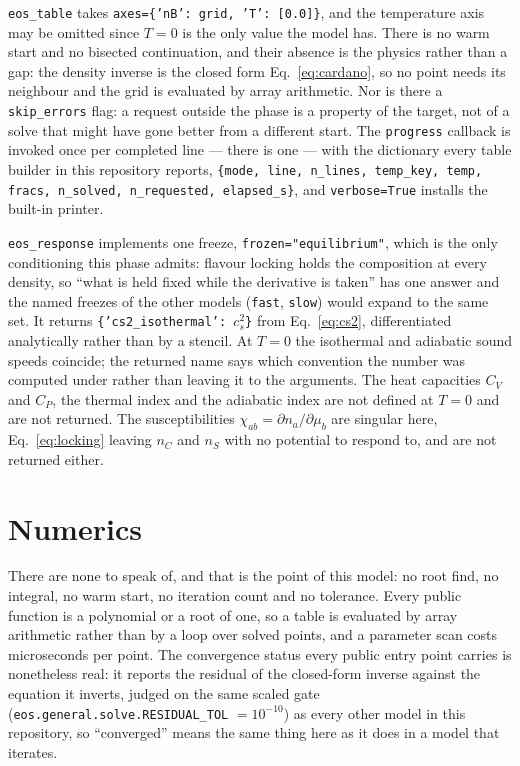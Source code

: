 \documentclass[aps,prc,onecolumn,superscriptaddress,nofootinbib,10pt]{revtex4-2}
\begin{document}
\texttt{eos\_table} takes \texttt{axes=\{'nB': grid, 'T': [0.0]\}}, and the
temperature axis may be omitted since $T = 0$ is the only value the model has.
There is no warm start and no bisected continuation, and their absence is the
physics rather than a gap: the density inverse is the closed form
Eq.~\eqref{eq:cardano}, so no point needs its neighbour and the grid is
evaluated by array arithmetic. Nor is there a \texttt{skip\_errors} flag: a
request outside the phase is a property of the target, not of a solve that
might have gone better from a different start. The \texttt{progress} callback
is invoked once per completed line --- there is one --- with the dictionary
every table builder in this repository reports,
\texttt{\{mode, line, n\_lines, temp\_key, temp, fracs, n\_solved,
n\_requested, elapsed\_s\}}, and \texttt{verbose=True} installs the built-in
printer.

\texttt{eos\_response} implements one freeze,
\texttt{frozen="equilibrium"}, which is the only conditioning this phase
admits: flavour locking holds the composition at every density, so ``what is
held fixed while the derivative is taken'' has one answer and the named freezes
of the other models (\texttt{fast}, \texttt{slow}) would expand to the same
set. It returns \texttt{\{'cs2\_isothermal': $c_s^2$\}} from
Eq.~\eqref{eq:cs2}, differentiated analytically rather than by a stencil. At
$T = 0$ the isothermal and adiabatic sound speeds coincide; the returned name
says which convention the number was computed under rather than leaving it to
the arguments. The heat capacities $C_V$ and $C_P$, the thermal index and the
adiabatic index are not defined at $T = 0$ and are not returned. The
susceptibilities $\chi_{ab} = \partial n_a/\partial \mu_b$ are singular here,
Eq.~\eqref{eq:locking} leaving $n_C$ and $n_S$ with no potential to respond to,
and are not returned either.

\section{Numerics}
\label{sec:numerics}

There are none to speak of, and that is the point of this model: no root
find, no integral, no warm start, no iteration count and no tolerance. Every
public function is a polynomial or a root of one, so a table is evaluated by
array arithmetic rather than by a loop over solved points, and a parameter
scan costs microseconds per point. The convergence status every public entry
point carries is nonetheless real: it reports the residual of the closed-form
inverse against the equation it inverts, judged on the same scaled gate
(\texttt{eos.general.solve.RESIDUAL\_TOL} $= 10^{-10}$) as every other model
in this repository, so ``converged'' means the same thing here as it does in a
model that iterates.
\end{document}
